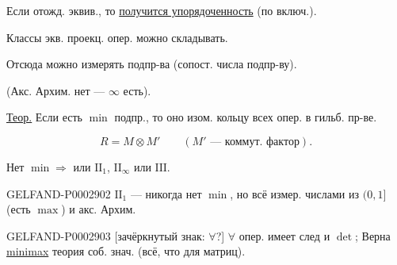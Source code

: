 Если отожд. эквив., то \underline{получится упорядоченность} (по включ.).

Классы экв. проекц. опер. можно складывать.

Отсюда можно измерять подпр-ва (сопост. числа подпр-ву).

(Акс. Архим. нет --- $\infty$ есть).

\underline{\underline{Теор.}} Если есть $\min$ подпр., то оно изом. кольцу всех опер. в гильб. пр-ве.

\begin{equation*}R=M\otimes M'\qquad(M'\text{ --- коммут. фактор}).\end{equation*}

Нет $\min\Longrightarrow$ или $\mathrm{II}_1$, $\mathrm{II}_\infty$ или $\mathrm{III}$.

\begin{GelfandAdjacentEvidence}{GELFAND-P000290}{2}
$\mathrm{II}_1$ --- никогда нет $\min$, но всё измер. числами из $(0,1]$ (есть $\max$) и акс. Архим.









\end{GelfandAdjacentEvidence}


\begin{GelfandAdjacentEvidence}{GELFAND-P000290}{3}
[зачёркнутый знак: $\forall$?] $\forall$ опер. имеет след и $\det$; Верна \underline{minimax} теория соб. знач. (всё, что для матриц).

\end{GelfandAdjacentEvidence}


